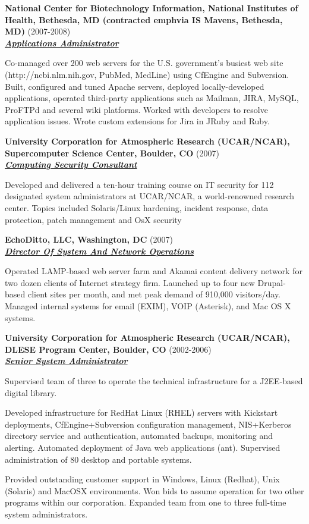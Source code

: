\documentclass{article}
\newcommand{\employer}[3]{{ \textbf{#1} (#2)\\ \underline{\textbf{\emph{#3}}}\\  }}
\newenvironment{achievements}{\begin{list}{\topsep 0pt \itemsep -2pt}} {\vspace*{4pt}\end{list}}
\begin{document}
\employer{National Center for Biotechnology Information, National Institutes
of Health, Bethesda, MD (contracted emph{via} IS Mavens, Bethesda,
MD)}{2007-2008}{Applications Administrator}
\begin{achievements}
   \item Co-managed over 200 web servers for the U.S. government's busiest web site (http://ncbi.nlm.nih.gov, PubMed, MedLine) using CfEngine and Subversion.  Built, configured and tuned Apache servers, deployed locally-developed applications, operated third-party applications such as Mailman, JIRA, MySQL, ProFTPd and several wiki platforms.  Worked with developers to resolve application issues.  Wrote custom extensions for Jira in JRuby and Ruby.
\end{achievements}

\employer{University Corporation for Atmospheric Research (UCAR/NCAR),
Supercomputer Science Center, Boulder, CO}{2007}{Computing Security Consultant}

\begin{achievements}
\item Developed and delivered a ten-hour training course on IT security for 112 designated system administrators at UCAR/NCAR, a world-renowned research center.  Topics included Solaris/Linux hardening, incident response, data protection, patch management and OsX security
\end{achievements}

\employer{EchoDitto, LLC, Washington, DC}{2007}{Director Of System And Network Operations}
\begin{achievements}
  \item Operated LAMP-based web server farm and Akamai content delivery network for two dozen clients of Internet strategy firm.  Launched up to four new Drupal-based client sites per month, and met peak demand of 910,000 visitors/day.  Managed internal systems for email (EXIM), VOIP (Asterisk), and Mac OS X systems. 
\end{achievements}
 
\employer{University Corporation for Atmospheric Research (UCAR/NCAR), DLESE
Program Center, Boulder, CO}{2002-2006}{Senior System Administrator}
\begin{achievements}
    \item Supervised team of three to operate the technical infrastructure for a J2EE-based digital library.  
    \item Developed infrastructure for RedHat Linux (RHEL) servers with Kickstart deployments, CfEngine+Subversion configuration management, NIS+Kerberos directory service and authentication, automated backups, monitoring and alerting.  Automated deployment of Java web applications (ant). Supervised administration of 80 desktop and portable systems.  
    \item Provided outstanding customer support in Windows, Linux (Redhat), Unix (Solaris) and MacOSX environments.  Won bids to assume operation for two other programs within our corporation.  Expanded team from one to three full-time system administrators. 
\end{achievements}
\end{document}
